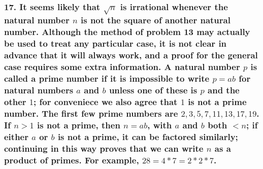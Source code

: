 \documentclass{article}
\begin{document}
\subsubsection*{17. It seems likely that $\sqrt{n}$ is irrational whenever the natural number $n$ is not the square of another natural number. Although the method of problem 13 may actually be used to treat any particular case, it is not clear in advance that it will always work, and a proof for the general case requires some extra information. A natural number $p$ is called a prime number if it is impossible to write $p = ab$ for natural numbers $a$ and $b$ unless one of these is $p$ and the other $1$; for conveniece we also agree that $1$ is not a prime number. The first few prime numbers are $2, 3, 5, 7, 11, 13, 17, 19$. If $n > 1$ is not a prime, then $n = ab$, with $a$ and $b$ both $< n$; if either $a$ or $b$ is not a prime, it can be factored similarly; continuing in this way proves that we can write $n$ as a product of primes. For example, $28 = 4 * 7 = 2 * 2 * 7$.}
\end{document}
